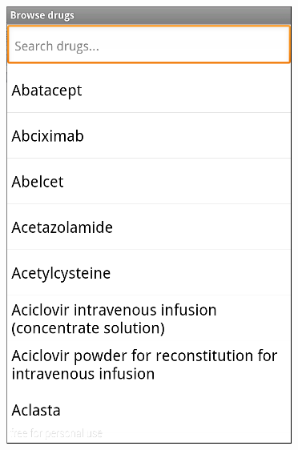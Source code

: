 \begin{figure}[H]
\centering
\begin{minipage}{.5\textwidth}
  \centering
  \includegraphics[width=.8\linewidth]{Images/screenshots/API10/browse.png}
\end{minipage}%
\begin{minipage}{.5\textwidth}
  \centering

\end{minipage}
\end{figure}
